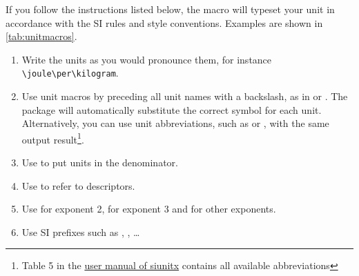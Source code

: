 If you follow the instructions listed below, the  macro will typeset your unit in accordance with the SI rules and style conventions. Examples are shown in \cref{tab:unitmacros}.
\begin{enumerate}
    \item Write the units as you would pronounce them, for instance \verb|\joule\per\kilogram|.
    \item Use unit macros by preceding all unit names with a backslash, as in  or . The package will automatically substitute the correct symbol for each unit. Alternatively, you can use unit abbreviations, such as  or , with the same output result\footnote{Table 5 in the \href{https://mirrors.ircam.fr/pub/CTAN/macros/latex/contrib/siunitx/siunitx.pdf}{user manual of siunitx} contains all available abbreviations}. 
    \item Use  to put units in the denominator.
    \item Use  to refer to descriptors.
    \item Use  for exponent 2,  for exponent 3 and  for other exponents.
    \item Use SI prefixes such as , , \dots
\end{enumerate}

